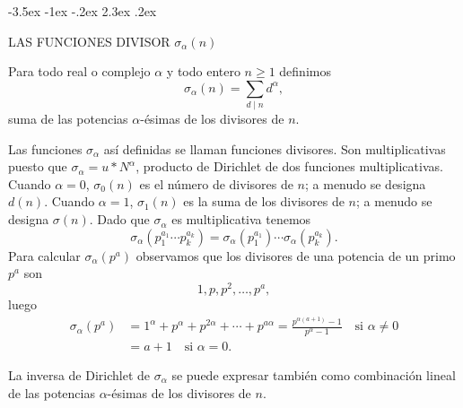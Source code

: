 \documentclass[12pt,a4paper]{book}
\makeatletter
\renewcommand\section{\@startsection{section}{1}{\z@}%
  {-3.5ex \@plus -1ex \@minus -.2ex}%
  {2.3ex \@plus .2ex}%
  {\normalfont\Large\bfseries\raggedright}}
\makeatother
\begin{document}
    \section{LAS FUNCIONES DIVISOR \texorpdfstring{$\sigma_{\alpha}(n)$}{σα(n)}}\label{sim:sig}
    \begin{definicion}
        Para todo real o complejo $\alpha$ y todo entero $n\geq1$ definimos
        \begin{equation*}
            \sigma_{\alpha}(n)=\sum_{d\mid n}d^{\alpha},
        \end{equation*}
        suma de las potencias $\alpha$-ésimas de los divisores de $n$.
    \end{definicion}

    Las funciones $\sigma_{\alpha}$ así definidas se llaman funciones divisores. Son
    multiplicativas puesto que $\sigma_{\alpha}=u*N^{\alpha}$, producto de Dirichlet de dos
    funciones multiplicativas. Cuando $\alpha=0$, $\sigma_{0}(n)$ es el número de divisores
    de $n$; a menudo se designa $d(n)$. Cuando $\alpha=1$, $\sigma_{1}(n)$ es la suma de los
    divisores de $n$; a menudo se designa $\sigma(n)$. Dado que $\sigma_{\alpha}$ es
    multiplicativa tenemos
    \begin{equation*}
        \sigma_{\alpha}(p_{1}^{a_{1}}\cdots p_{k}^{a_{k}})=\sigma_{\alpha}(p_{1}^{a_{1}})\cdots\sigma_{\alpha}(p_{k}^{a_{k}}).
    \end{equation*}
    Para calcular $\sigma_{\alpha}(p^{a})$ observamos que los divisores de una potencia de un
    primo $p^{a}$ son
    \begin{equation*}
        1,p,p^{2},\dots,p^{a},
    \end{equation*}
    luego
    \begin{align*}
        \sigma_{\alpha}(p^{a})&=1^{\alpha}+p^{\alpha}+p^{2\alpha}+\cdots+p^{a\alpha}
        =\frac{p^{\alpha(a+1)}-1}{p^{\alpha}-1}\quad\text{si } \alpha\neq0\\
        &=a+1\quad\text{si } \alpha=0.
    \end{align*}

    La inversa de Dirichlet de $\sigma_{\alpha}$ se puede expresar también como combinación
    lineal de las potencias $\alpha$-ésimas de los divisores de $n$.
\end{document}
